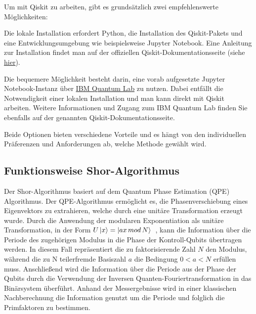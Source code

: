 \documentclass[
  a4paper, %
  10pt, %
  unnumberedsections, %
  twoside, %
]{LTJournalArticle}
\begin{document}
Um mit Qiskit zu arbeiten, gibt es grundsätzlich zwei empfehlenswerte Möglichkeiten:
\begin{description}[style=nextline]
\item[Lokale Installation]
Die lokale Installation erfordert Python,
die Installation des Qiskit-Pakets und eine Entwicklungsumgebung wie beispielsweise Jupyter Notebook.
Eine Anleitung zur Installation findet man auf der offiziellen Qiskit-Dokumentationsseite
(siehe \href{https://qiskit.org/documentation/stable/0.24/install.html}{hier}).
\item[IBM Quantum Lab]
Die bequemere Möglichkeit besteht darin,
eine vorab aufgesetzte Jupyter Notebook-Instanz über
\href{https://qiskit.org/documentation/stable/0.24/install.html}{IBM Quantum Lab}
zu nutzen.
Dabei entfällt die Notwendigkeit einer lokalen Installation und man kann direkt mit Qiskit arbeiten.
Weitere Informationen und Zugang zum IBM Quantum Lab finden Sie ebenfalls auf der genannten Qiskit-Dokumentationsseite.
\end{description}
Beide Optionen bieten verschiedene Vorteile und es hängt von den individuellen Präferenzen und Anforderungen ab,
welche Methode gewählt wird.

\subsection{\Large Funktionsweise Shor-Algorithmus}

Der Shor-Algorithmus basiert auf dem Quantum Phase Estimation (QPE) Algorithmus.
Der QPE-Algorithmus ermöglicht es, die Phasenverschiebung eines Eigenvektors zu extrahieren,
welche durch eine unitäre Transformation erzeugt wurde.
Durch die Anwendung der modularen Exponentiation als unitäre Transformation,
in der Form $U\ket{x} = \ket{ax\,mod\,N}$~\autocite{IBM:Shor},
kann die Information über die Periode des zugehörigen Modulus in die Phase der Kontroll-Qubits übertragen werden.
In diesem Fall repräsentiert die zu faktorisierende Zahl $N$ den Modulus,
während die zu N teilerfremde Basiszahl $a$ die Bedingung $0 < a < N$ erfüllen muss.
Anschließend wird die Information über die Periode aus der Phase der Qubits
durch die Verwendung der Inversen Quanten-Fouriertransformation in das Binärsystem überführt.
Anhand der Messergebnisse wird in einer klassischen Nachberechnung die Information genutzt
um die Periode und folglich die Primfaktoren zu bestimmen.
\end{document}
